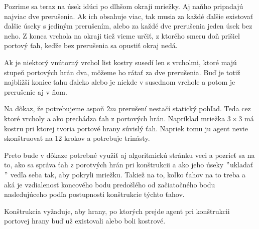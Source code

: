 Pozrime sa teraz na úsek idúci po dlhšom okraji mriežky. Aj naňho pripadajú
najviac dve prerušenia. Ak ich obsahuje viac, tak musia za každé ďalšie
existovať ďalšie úseky s jediným prerušením, alebo za každé dve prerušenia
jeden úsek bez neho. Z konca vrchola na okraji tiež vieme určiť, z ktorého
smeru doň prišiel portový ťah, keďže bez prerušenia sa opustiť okraj nedá.

Ak je niektorý vnútorný vrchol list kostry susedí len s vrcholmi, 
ktoré majú stupeň portových hrán dva, môžeme
ho rátať za dve prerušenia. Buď je totiž najbližší koniec ťahu ďaleko alebo
je niekde v  susednom vrchole a potom je prerušenie aj v ňom.

Na dôkaz, že potrebujeme aspoň $2m$ prerušení nestačí statický pohľad. Teda
cez ktoré vrcholy a ako prechádza ťah z portových hrán. Napríklad mriežka $3
\times 3$ má kostru pri ktorej tvoria portové hrany súvislý ťah. Napriek
tomu ju agent nevie skonštruovať na 12 krokov a potrebuje trinásty.

Preto bude v dôkaze potrebné využiť aj algoritmickú stránku veci a pozrieť
sa na to, ako sa správa ťah z porotvých hrán pri konštrukcii a ako jeho
úseky $"$ukladať$"$ vedľa seba tak, aby pokryli mriežku. Takiež na to, koľko
ťahov na to treba a aká je vzdialenosť koncového bodu predošlého od
začiatočného bodu nasledujúceho podľa postupnosti konštrukcie týchto ťahov.

Konštrukcia vyžaduje, aby hrany, po ktorých prejde agent pri konštrukcii
portovej hrany buď už existovali alebo boli kostrové.

